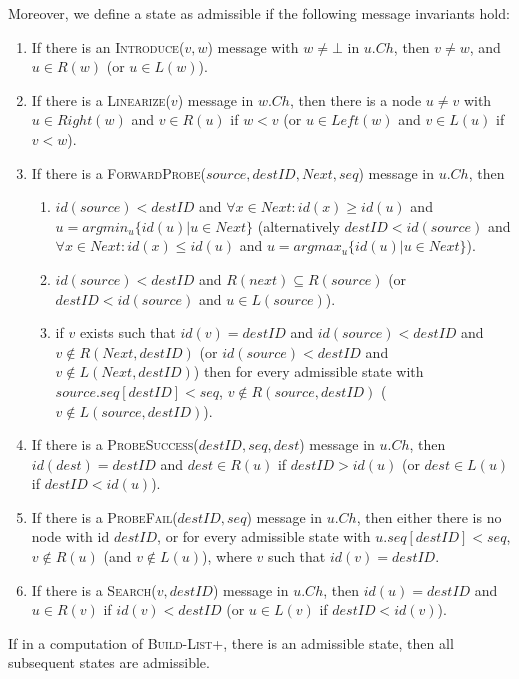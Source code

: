 \documentclass[a4paper,USenglish]{lipics}
\newcommand{\blp}{\textsc{Build-List+}\xspace}
\newcommand{\linearize}[1]{\textsc{Linearize(\ensuremath{#1})}\xspace}
\newcommand{\introduce}[1]{\textsc{Introduce(\ensuremath{#1})}\xspace}
\newcommand{\search}[1]{\textsc{Search(\ensuremath{#1})}\xspace}
\newcommand{\forwardprobe}[1]{\textsc{ForwardProbe(\ensuremath{#1})}\xspace}
\newcommand{\psuccess}[1]{\textsc{ProbeSuccess(\ensuremath{#1})}\xspace}
\newcommand{\pfail}[1]{\textsc{ProbeFail(\ensuremath{#1})}\xspace}
\begin{document}
Moreover, we define a state as admissible if the following message invariants hold:
\begin{enumerate}
 \item If there is an \introduce{v,w} message with $w \neq \bot$ in $u.Ch$, then $v \neq w$, and $u \in R(w)$ (or $u \in L(w)$).
 \item If there is a \linearize{v} message in $w.Ch$, then there is a node $u \neq v$ with $u \in Right(w)$ and $v \in R(u)$ if $w < v$ (or $u \in Left(w)$ and $v \in L(u)$ if $v < w$).
 \item If there is a \forwardprobe{source,destID,Next,seq} message in $u.Ch$, then
    \begin{enumerate}
      \item $id(source) < destID$ and $\forall x \in Next: id(x) \geq id(u)$ and $u = argmin_u\{id(u) | u \in Next\}$ 
      (alternatively $destID < id(source)$ and $\forall x \in Next: id(x) \leq id(u)$ and $u = argmax_u\{id(u) | u \in Next\}$).
      \item $id(source) < destID$ and $R(next) \subseteq R(source)$ (or $destID < id(source)$ and $u \in L(source)$).
      \item if $v$ exists such that $id(v) = destID$ and $id(source) < destID$ and $v \notin R(Next,destID)$ (or $id(source) < destID$ and $v \notin L(Next,destID)$) then for every admissible state with $source.seq[destID] < seq$, $v \notin R(source,destID)$ ($v \notin L(source,destID)$).
    \end{enumerate}
 \item If there is a \psuccess{destID, seq, dest} message in $u.Ch$, then $id(dest) = destID$ and $dest \in R(u)$ if $destID > id(u)$ (or $dest \in L(u)$ if $destID < id(u)$).
 \item If there is a \pfail{destID, seq} message in $u.Ch$, then either there is no node with id $destID$, or for every admissible state with $u.seq[destID] < seq$, $v \notin R(u)$ (and $v \notin L(u)$), where $v$ such that $id(v)= destID$.
 \item If there is a \search{v, destID} message in $u.Ch$, then $id(u) = destID$ and $u \in R(v)$ if $id(v) < destID$ (or $u \in L(v)$ if $destID < id(v)$).
\end{enumerate}



\begin{lemma}\label{lem:once_admissible_always_admissible}
 If in a computation of \blp, there is an admissible state, then all subsequent states are admissible.
\end{lemma}
\end{document}
